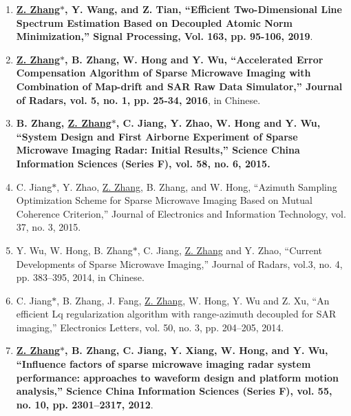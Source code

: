 \documentclass[paper=a4,fontsize=11pt]{scrartcl}
\begin{document}
\begin{enumerate}
	\item \textbf{\underline{Z. Zhang$\ast$}, Y. Wang, and Z. Tian, ``Efficient Two-Dimensional Line Spectrum Estimation Based on Decoupled Atomic Norm Minimization,'' Signal Processing, Vol. 163, pp. 95-106, 2019}.
	
	
	
	\item \textbf{\underline{Z. Zhang$\ast$}, B. Zhang, W. Hong and Y. Wu, ``Accelerated Error Compensation Algorithm of Sparse Microwave Imaging with Combination of Map-drift and SAR Raw Data Simulator,'' Journal of Radars, vol. 5, no. 1, pp. 25-34, 2016}, in Chinese.
	
	\item \textbf{B. Zhang, \underline{Z. Zhang$\ast$}, C. Jiang, Y. Zhao, W. Hong and Y. Wu, ``System Design and First Airborne Experiment of Sparse Microwave Imaging Radar: Initial Results,'' Science China Information Sciences (Series F), vol. 58, no. 6, 2015.}
	
	\item C. Jiang$\ast$, Y. Zhao, \underline{Z. Zhang}, B. Zhang, and W. Hong, ``Azimuth Sampling Optimization Scheme for Sparse Microwave Imaging Based on Mutual Coherence Criterion,'' Journal of Electronics and Information Technology, vol. 37, no. 3, 2015.
	
	\item Y. Wu, W. Hong, B. Zhang$\ast$, C. Jiang, \underline{Z. Zhang} and Y. Zhao, ``Current Developments of Sparse Microwave Imaging,'' Journal of Radars, vol.3, no. 4, pp. 383--395, 2014, in Chinese.
	
	\item C. Jiang$\ast$, B. Zhang, J. Fang, \underline{Z. Zhang}, W. Hong, Y. Wu and Z. Xu, ``An efficient Lq regularization algorithm with range-azimuth decoupled for SAR imaging,'' Electronics Letters, vol. 50, no. 3, pp. 204--205, 2014.
	
	\item \textbf{\underline{Z. Zhang$\ast$}, B. Zhang, C. Jiang, Y. Xiang, W. Hong, and Y. Wu, ``Influence factors of sparse microwave imaging radar system performance: approaches to waveform design and platform motion analysis,'' Science China Information Sciences (Series F), vol. 55, no. 10, pp. 2301--2317, 2012}.
	

\end{enumerate}
\end{document}
